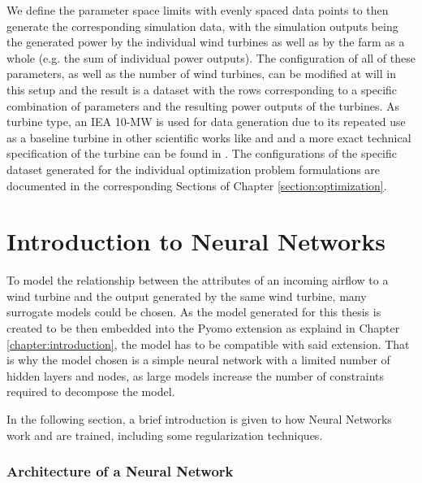  We define the parameter space limits with evenly spaced data points to then generate the corresponding simulation data, with the simulation outputs being the generated power by the individual wind turbines as well as by the farm as a whole (e.g. the sum of individual power outputs). The configuration of all of these parameters, as well as the number of wind turbines, can be modified at will in this setup and the result is a dataset with the rows corresponding to a specific combination of parameters and the resulting power outputs of the turbines. As turbine type, an IEA 10-MW is used for data generation due to its repeated use as a baseline turbine in other scientific works like \cite{Madsen2022} and \cite{Kainz2024IEA} and a more exact technical specification of the turbine can be found in \cite{Bortolotti2019}. The configurations of the specific dataset generated for the individual optimization problem formulations are documented in the corresponding Sections of Chapter \ref{section:optimization}.


\section{Introduction to Neural Networks} \label{sec:modelling}

To model the relationship between the attributes of an incoming airflow to a wind turbine and the output generated by the same wind turbine, many surrogate models could be chosen. As the model generated for this thesis is created to be then embedded into the Pyomo extension as explaind in Chapter \ref{chapter:introduction}, the model has to be compatible with said extension. That is why the model chosen is a simple neural network with a limited number of hidden layers and nodes, as large models increase the number of constraints required to decompose the model. 

In the following section, a brief introduction is given to how Neural Networks work and are trained, including some regularization techniques.

\subsubsection{Architecture of a Neural Network}

